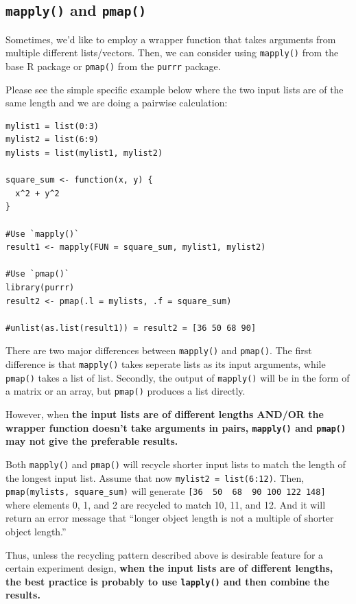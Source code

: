 \documentclass[
]{book}
\begin{document}
\subsection{\texorpdfstring{\texttt{mapply()} and \texttt{pmap()}}{mapply() and pmap()}}\label{mapply-and-pmap}

Sometimes, we'd like to employ a wrapper function that takes arguments from multiple different lists/vectors. Then, we can consider using \texttt{mapply()} from the base R package or \texttt{pmap()} from the \texttt{purrr} package.

Please see the simple specific example below where the two input lists are of the same length and we are doing a pairwise calculation:

\begin{verbatim}
mylist1 = list(0:3)
mylist2 = list(6:9)
mylists = list(mylist1, mylist2)

square_sum <- function(x, y) {
  x^2 + y^2
}

#Use `mapply()`
result1 <- mapply(FUN = square_sum, mylist1, mylist2)

#Use `pmap()`
library(purrr)
result2 <- pmap(.l = mylists, .f = square_sum)

#unlist(as.list(result1)) = result2 = [36 50 68 90]
\end{verbatim}

There are two major differences between \texttt{mapply()} and \texttt{pmap()}. The first difference is that \texttt{mapply()} takes seperate lists as its input arguments, while \texttt{pmap()} takes a list of list. Secondly, the output of \texttt{mapply()} will be in the form of a matrix or an array, but \texttt{pmap()} produces a list directly.

However, when \textbf{the input lists are of different lengths AND/OR the wrapper function doesn't take arguments in pairs, \texttt{mapply()} and \texttt{pmap()} may not give the preferable results.}

Both \texttt{mapply()} and \texttt{pmap()} will recycle shorter input lists to match the length of the longest input list. Assume that now \texttt{mylist2\ =\ list(6:12)}. Then, \texttt{pmap(mylists,\ square\_sum)} will generate \texttt{{[}36\ \ 50\ \ 68\ \ 90\ 100\ 122\ 148{]}} where elements 0, 1, and 2 are recycled to match 10, 11, and 12. And it will return an error message that ``longer object length is not a multiple of shorter object length.''

Thus, unless the recycling pattern described above is desirable feature for a certain experiment design, \textbf{when the input lists are of different lengths, the best practice is probably to use \texttt{lapply()} and then combine the results.}
\end{document}
